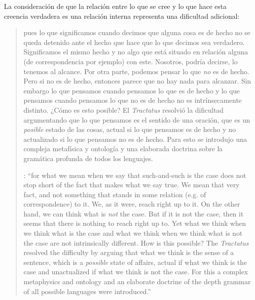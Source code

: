 La consideración de que la relación entre lo que se cree y lo que hace esta creencia verdadera es una relación interna representa una dificultad adicional: \blockquote[{\Cite[4]{hacker2000mind}}: \enquote{for what we mean when we say that such-and-such is the case does not stop short of the fact that makes what we say true. We mean that very fact, and not something that stands in some relation (e.g. of correspondence) to it. We, as it were, reach right up to it. On the other hand, we can think what is \emph{not} the case. But if it is not the case, then it seems that there is nothing to reach right up to. Yet what we think when we think what is the case and what we think when we think what is not the case are not intrinsically different. How is this possible? The \emph{Tractatus} resolved the difficulty by arguing that what we think is the sense of a sentence, which is a \emph{possible} state of affairs, actual if what we think is the case and unactualized if what we think is not the case. For this a complex metaphysics and ontology and an elaborate doctrine of the depth grammar of all possible languages were introduced.}]{pues lo que significamos cuando decimos que alguna cosa es de hecho no se queda detenido ante el hecho que hace que lo que decimos sea verdadero. Significamos el mismo hecho y no algo que está situado en relación alguna (de correspondencia por ejemplo) con este. Nosotros, podría decirse, lo tenemos al alcance. Por otra parte, podemos pensar lo que \emph{no} es de hecho. Pero si no es de hecho, entonces parece que no hay nada para alcanzar. Sin embargo lo que pensamos cuando pensamos lo que es de hecho y lo que pensamos cuando pensamos lo que no es de hecho no es intrínsecamente distinto. ¿Cómo es esto posible? El \emph{Tractatus} resolvió la dificultad argumentando que lo que pensamos es el sentido de una oración, que es un \emph{posible} estado de las cosas, actual si lo que pensamos es de hecho y no actualizado si lo que pensamos no es de hecho. Para esto se introdujo una compleja metafísica y ontología y una elaborada doctrina sobre la gramática profunda de todos los lenguajes.}
